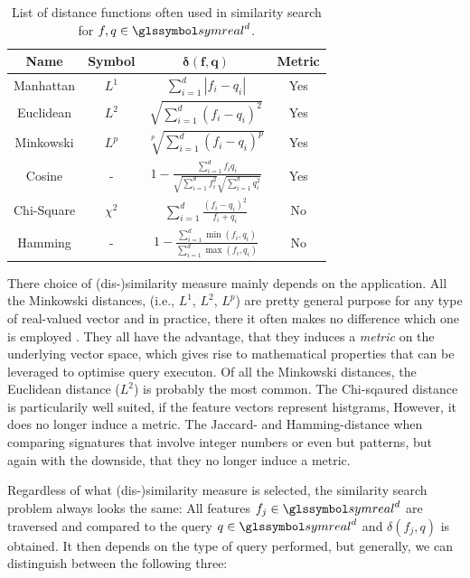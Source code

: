 \begin{table}[hb]
    \begin{tabular}{ | c | c | c | c |}
        \hline
        \textbf{Name} & \textbf{Symbol} & $\mathbf{\delta(f,q)}$ & \textbf{Metric} \\
        \hline
        \hline 
        Manhattan & $L^1$ & $\sum_{i=1}^{d} | f_i - q_i |$ & Yes \\ 
        \hline
        Euclidean & $L^2$ & $\sqrt{\sum_{i=1}^{d} (f_i - q_i)^2}$ & Yes \\  
        \hline
        Minkowski & $L^p$ & $\sqrt[p]{\sum_{i=1}^{d} (f_i - q_i)^p}$ & Yes \\ 
        \hline
        Cosine & - & $1 - \frac{\sum_{i=1}^{d} f_{i}q_{i}}{\sqrt{\sum_{i=1}^{d} f_i^2} \sqrt{\sum_{i=1}^{d} q_i^2}}$ & Yes \\  
        \hline
        Chi-Square & $\chi^2$ & $\sum_{i=1}^{d} \frac{(f_i - q_i)^2}{f_i + q_i}$ & No \\ 
        \hline
        Hamming & - & $1 - \frac{\sum_{i=1}^{d} \min (f_{i},q_{i})}{\sum_{i=1}^{d}  \max (f_{i},q_{i})}$ & No \\
        \hline
    \end{tabular}
    \caption{List of distance functions often used in similarity search for $f, q \in \symreal^d$.}
    \label{table:similarity_measures}
\end{table}

There choice of (dis-)similarity measure mainly depends on the application. All the Minkowski distances, (i.e., $L^1$, $L^2$, $L^p$) are pretty general purpose for any type of real-valued vector and in practice, there it often makes no difference which one is employed \cite{Rossetto:2018thesis}. They all have the advantage, that they induces a \emph{metric} on the underlying vector space, which gives rise to mathematical properties that can be leveraged to optimise query executon. Of all the Minkowski distances, the Euclidean distance ($L^2$) is probably the most common. The Chi-sqaured distance is particularily well suited, if the feature vectors represent histgrams, However, it does no longer induce a metric. The Jaccard- and Hamming-distance when comparing signatures that involve integer numbers or even but patterns, but again with the downside, that they no longer induce a metric.

Regardless of what (dis-)similarity measure is selected, the similarity search problem always looks the same: All features $f_j \in \symreal^d$ are traversed and compared to the query $q \in \symreal^d$ and $\delta(f_j, q)$ is obtained. It then depends on the type of query performed, but generally, we can distinguish between the following three:

